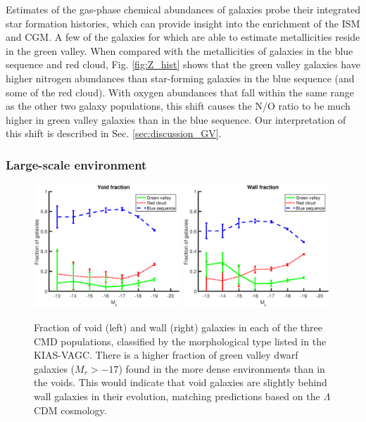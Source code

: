 Estimates of the gas-phase chemical abundances of galaxies probe their 
integrated star formation histories, which can provide insight into the 
enrichment of the ISM and CGM.  A few of the galaxies for which 
\cite{Douglass17c} are able to estimate metallicities reside in the green 
valley.  When compared with the metallicities of galaxies in the blue sequence 
and red cloud, Fig. \ref{fig:Z_hist} shows that the green valley galaxies have 
higher nitrogen abundances than star-forming galaxies in the blue sequence (and 
some of the red cloud).  With oxygen abundances that fall within the same range 
as the other two galaxy populations, this shift causes the N/O ratio to be much 
higher in green valley galaxies than in the blue sequence.  Our interpretation 
of this shift is described in Sec. \ref{sec:discussion_GV}.


\subsubsection{Large-scale environment}

\begin{figure}
    \includegraphics[width=0.49\textwidth]{Images/GV/voidFrac_CMD}
    \includegraphics[width=0.49\textwidth]{Images/GV/wallFrac_CMD}
    \caption[Fraction of galaxies in CMD populations by morphological type]
    {Fraction of void (left) and wall (right) galaxies in each of the three CMD 
    populations, classified by the morphological type listed in the KIAS-VAGC.  
    There is a higher fraction of green valley dwarf galaxies ($M_r > -17$) 
    found in the more dense environments than in the voids.  This would indicate 
    that void galaxies are slightly behind wall galaxies in their evolution, 
    matching predictions based on the $\Lambda$CDM cosmology.}
    \label{fig:Mr_bin}
\end{figure}

